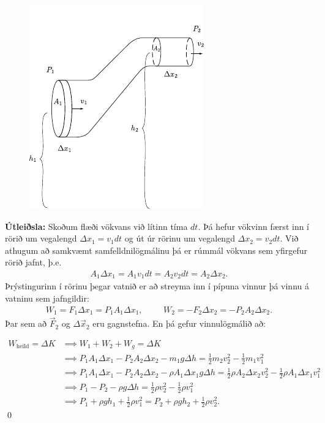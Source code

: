 \begin{minipage}{\linewidth}
\begin{figure}
    \vspace{-1cm}
    \centering
    \includegraphics[scale = 1.2]{figures/bernoulli.pdf}
    \label{fig:bern}
\end{figure}

\textbf{Útleiðsla:} Skoðum flæði vökvans við lítinn tíma $dt$. Þá hefur vökvinn færst inn í rörið um vegalengd $\Delta x_1 = v_1 dt$ og út úr rörinu um vegalengd $\Delta x_2 = v_2 dt$. Við athugum að samkvæmt samfelldnilögmálinu þá er rúmmál vökvans sem yfirgefur rörið jafnt, þ.e.
\begin{align*}
     A_1 \Delta x_1 = A_1 v_1 dt = A_2 v_2 dt = A_2 \Delta x_2.
\end{align*}
Þrýstingurinn í rörinu þegar vatnið er að streyma inn í pípuna vinnur þá vinnu á vatninu sem jafngildir:
\begin{align*}
    W_1 = F_1 \Delta x_1 = P_1 A_1 \Delta x_1, \hspace{1cm} W_2 = -F_2 \Delta x_2 = -P_2 A_2 \Delta x_2.
\end{align*}
Þar sem að $\Vec{F}_2$ og $\Delta \Vec{x}_2$ eru gagnstefna. En þá gefur vinnulögmálið að:
\end{minipage}
\begin{align*}
    W_{\text{heild}} = \Delta K &\implies W_1 + W_2 + W_{g} = \Delta K \\
    &\implies P_1 A_1 \Delta x_1 - P_2A_2 \Delta x_2 - m_1g \Delta h = \frac{1}{2}m_2 v_2^2 - \frac{1}{2}m_1v_1^2 \\
    &\implies P_1 A_1 \Delta x_1 - P_2A_2 \Delta x_2 - \rho A_1 \Delta x_1 g \Delta h = \frac{1}{2} \rho A_2 \Delta x_2 v_2^2 - \frac{1}{2} \rho A_1 \Delta x_1 v_1^2 \\
    &\implies P_1 - P_2 - \rho g\Delta h = \frac{1}{2}\rho v_2^2 - \frac{1}{2}\rho v_1^2 \\
    &\implies P_1 + \rho g h_1 + \frac{1}{2}\rho v_1^2 = P_2 + \rho g h_2 + \frac{1}{2}\rho v_2^2.
\end{align*}
\qed



